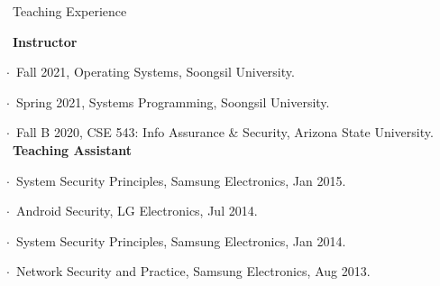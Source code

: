 \documentclass{resume} %
\begin{document}
\begin{rSection}{\faGenderless~Teaching Experience}

    \textbullet~{\bf Instructor} \\
        \strut\hspace{1cm}$\cdot$~Fall 2021, Operating Systems, Soongsil University.\\
        \strut\hspace{1cm}$\cdot$~Spring 2021, Systems Programming, Soongsil University.\\
        \strut\hspace{1cm}$\cdot$~Fall B 2020, CSE 543: Info Assurance \& Security, Arizona State University.\\

	\textbullet~{\bf Teaching Assistant} \\
		\strut\hspace{1cm}$\cdot$~System Security Principles, Samsung Electronics, Jan 2015.\\
		\strut\hspace{1cm}$\cdot$~Android Security, LG Electronics, Jul 2014.\\
		\strut\hspace{1cm}$\cdot$~System Security Principles, Samsung Electronics, Jan 2014.\\
		\strut\hspace{1cm}$\cdot$~Network Security and Practice, Samsung Electronics, Aug 2013.

	\vspace{3mm}
\end{rSection}	

%




\end{document}
